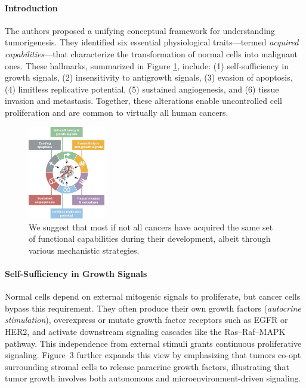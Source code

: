 \documentclass[10pt]{extarticle}
\begin{document}
\paragraph{Introduction}
The authors proposed a unifying conceptual framework for understanding tumorigenesis. They identified six essential physiological traits—termed \textit{acquired capabilities}—that characterize the transformation of normal cells into malignant ones. These hallmarks, summarized in Figure \ref{fig:capab_tumor}, include: (1) self-sufficiency in growth signals, (2) insensitivity to antigrowth signals, (3) evasion of apoptosis, (4) limitless replicative potential, (5) sustained angiogenesis, and (6) tissue invasion and metastasis. Together, these alterations enable uncontrolled cell proliferation and are common to virtually all human cancers.

\begin{figure}[h]
    \centering
    \includegraphics[width=0.3\textwidth]{Figures/Acquired Capabilities of Cancer.jpg} %
    \caption{We suggest that most if not all cancers have acquired the same set of functional capabilities during their development, albeit through various mechanistic strategies.}
    \label{fig:capab_tumor}
\end{figure}

\paragraph{Self-Sufficiency in Growth Signals}
Normal cells depend on external mitogenic signals to proliferate, but cancer cells bypass this requirement. They often produce their own growth factors (\textit{autocrine stimulation}), overexpress or mutate growth factor receptors such as EGFR or HER2, and activate downstream signaling cascades like the Ras–Raf–MAPK pathway. This independence from external stimuli grants continuous proliferative signaling. Figure~3 further expands this view by emphasizing that tumors co-opt surrounding stromal cells to release paracrine growth factors, illustrating that tumor growth involves both autonomous and microenvironment-driven signaling.
\end{document}
